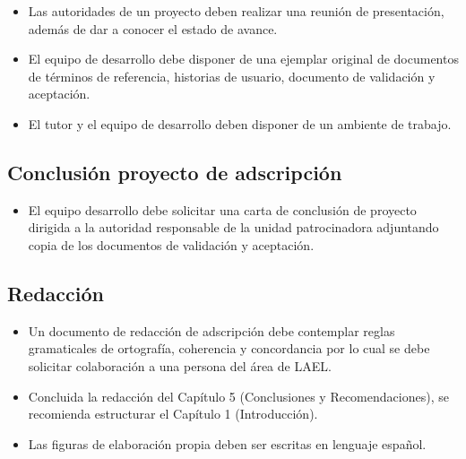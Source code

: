 \begin{itemize}

\item Las autoridades de un proyecto deben realizar una reunión de
presentación, además de dar a conocer el estado de avance.

\item El equipo de desarrollo debe disponer de una ejemplar original de
documentos de términos de referencia, historias de usuario, documento de
validación y aceptación.

\item El tutor y el equipo de desarrollo deben disponer de un ambiente de
trabajo.

\end{itemize}

\subsection{Conclusión proyecto de adscripción}

\begin{itemize}

\item El equipo desarrollo debe solicitar una carta de conclusión de proyecto
dirigida a la autoridad responsable de la unidad patrocinadora adjuntando
copia de los documentos de validación y aceptación.

\end{itemize}

\subsection{Redacción}

\begin{itemize} 

\item Un documento de redacción de adscripción debe contemplar reglas
gramaticales de ortografía, coherencia y concordancia por lo cual se debe
solicitar colaboración a una persona del área de LAEL.

\item Concluida la redacción del Capítulo 5 (Conclusiones y Recomendaciones),
se recomienda estructurar el Capítulo 1 (Introducción).

\item Las figuras de elaboración propia deben ser escritas en lenguaje 
español.

\end{itemize}

